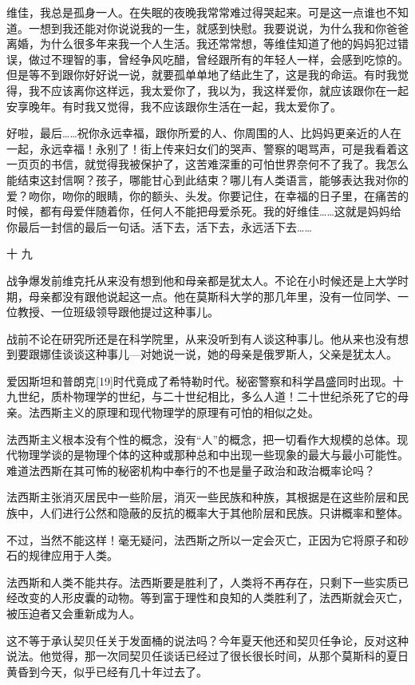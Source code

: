维佳，我总是孤身一人。在失眠的夜晚我常常难过得哭起来。可是这一点谁也不知道。一想到我还能对你说说我的一生，就感到快慰。我要说说，为什么我和你爸爸离婚，为什么很多年来我一个人生活。我还常常想，等维佳知道了他的妈妈犯过错误，做过不理智的事，曾经争风吃醋，曾经跟所有的年轻人一样，会感到吃惊的。但是等不到跟你好好说一说，就要孤单单地了结此生了，这是我的命运。有时我觉得，我不应该离你这样远，我太爱你了，我以为，我这样爱你，就应该跟你在一起安享晚年。有时我又觉得，我不应该跟你生活在一起，我太爱你了。

好啦，最后……祝你永远幸福，跟你所爱的人、你周围的人、比妈妈更亲近的人在一起，永远幸福！永别了！街上传来妇女们的哭声、警察的喝骂声，可是我看着这一页页的书信，就觉得我被保护了，这苦难深重的可怕世界奈何不了我了。我怎么能结束这封信啊？孩子，哪能甘心到此结束？哪儿有人类语言，能够表达我对你的爱？吻你，吻你的眼睛，你的额头、头发。你要记住，在幸福的日子里，在痛苦的时候，都有母爱伴随着你，任何人不能把母爱杀死。我的好维佳……这就是妈妈给你最后一封信的最后一句话。活下去，活下去，永远活下去……

十 九

战争爆发前维克托从来没有想到他和母亲都是犹太人。不论在小时候还是上大学时期，母亲都没有跟他说起这一点。他在莫斯科大学的那几年里，没有一位同学、一位教授、一位班级领导跟他提过这种事儿。

战前不论在研究所还是在科学院里，从来没听到有人谈这种事儿。他从来也没有想到要跟娜佳谈谈这种事儿—对她说一说，她的母亲是俄罗斯人，父亲是犹太人。

爱因斯坦和普朗克[19]时代竟成了希特勒时代。秘密警察和科学昌盛同时出现。十九世纪，质朴物理学的世纪，与二十世纪相比，多么人道！二十世纪杀死了它的母亲。法西斯主义的原理和现代物理学的原理有可怕的相似之处。

法西斯主义根本没有个性的概念，没有“人”的概念，把一切看作大规模的总体。现代物理学谈的是物理个体的这种或那种总和中出现一些现象的最大与最小可能性。难道法西斯在其可怖的秘密机构中奉行的不也是量子政治和政治概率论吗？

法西斯主张消灭居民中一些阶层，消灭一些民族和种族，其根据是在这些阶层和民族中，人们进行公然和隐蔽的反抗的概率大于其他阶层和民族。只讲概率和整体。

不过，当然不能这样！毫无疑问，法西斯之所以一定会灭亡，正因为它将原子和砂石的规律应用于人类。

法西斯和人类不能共存。法西斯要是胜利了，人类将不再存在，只剩下一些实质已经改变的人形皮囊的动物。等到富于理性和良知的人类胜利了，法西斯就会灭亡，被压迫者又会重新成为人。

这不等于承认契贝任关于发面桶的说法吗？今年夏天他还和契贝任争论，反对这种说法。他觉得，那一次同契贝任谈话已经过了很长很长时间，从那个莫斯科的夏日黄昏到今天，似乎已经有几十年过去了。

